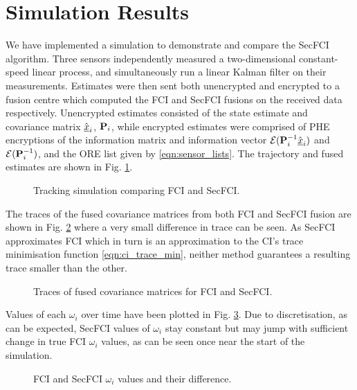 \documentclass[letterpaper, 10 pt, conference]{ieeeconf}  %
\begin{document}
\section{Simulation Results} \label{sec:results}
We have implemented a simulation to demonstrate and compare the SecFCI algorithm. Three sensors independently measured a two-dimensional constant-speed linear process, and simultaneously run a linear Kalman filter on their measurements. Estimates were then sent both unencrypted and encrypted to a fusion centre which computed the FCI and SecFCI fusions on the received data respectively. Unencrypted estimates consisted of the state estimate and covariance matrix $\hat{{\underline{x}}}_i$, ${{\mathbf{P}}}_i$, while encrypted estimates were comprised of PHE encryptions of the information matrix and information vector $\mathcal{E}({{\mathbf{P}}}^{-1}_i\hat{{\underline{x}}}_i)$ and $\mathcal{E}({{\mathbf{P}}}^{-1}_i)$, and the ORE list given by \eqref{eqn:sensor_lists}. The trajectory and fused estimates are shown in Fig. \ref{fig:fci_secfci_traj}.
\begin{figure}[tb]
   \vspace{-5pt}
   \begin{center}
      
   \end{center}
   \vspace{-10pt}
   \caption{Tracking simulation comparing FCI and SecFCI.}
   \label{fig:fci_secfci_traj}
\end{figure}

The traces of the fused covariance matrices from both FCI and SecFCI fusion are shown in Fig. \ref{fig:fci_secfci_trace} where a very small difference in trace can be seen. As SecFCI approximates FCI which in turn is an approximation to the CI's trace minimisation function \eqref{eqn:ci_trace_min}, neither method guarantees a resulting trace smaller than the other.
\begin{figure}[tb]
   \vspace{-5pt}
   \begin{center}
      
   \end{center}
   \vspace{-10pt}
   \caption{Traces of fused covariance matrices for FCI and SecFCI.}
   \label{fig:fci_secfci_trace}
\end{figure}
Values of each $\omega_i$ over time have been plotted in Fig. \ref{fig:fci_secfci_omegas}. Due to discretisation, as can be expected, SecFCI values of $\omega_i$ stay constant but may jump with sufficient change in true FCI $\omega_i$ values, as can be seen once near the start of the simulation.
\begin{figure}[tb]
   \vspace{-5pt}
   \begin{center}
      
   \end{center}
   \vspace{-10pt}
   \caption{FCI and SecFCI $\omega_i$ values and their difference.}
   \label{fig:fci_secfci_omegas}
\end{figure}
\end{document}
